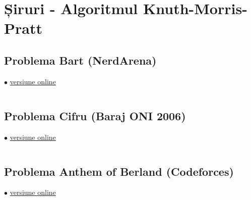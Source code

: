 \documentclass[../main.tex]{subfiles}
\begin{document}
\chapter{Șiruri - Algoritmul Knuth-Morris-Pratt}

\section{Problema Bart (NerdArena)}
\label{code:bart}
$\bullet$
\href{https://www.nerdarena.ro/job_detail/860802?action=view-source}{versiune online}

\inputminted{cpp}{../src/strings/bart.cpp}

\section{Problema Cifru (Baraj ONI 2006)}
\label{code:cifru}
$\bullet$
\href{https://kilonova.ro/submissions/1113957}{versiune online}

\inputminted{cpp}{../src/strings/cifru.cpp}

\section{Problema Anthem of Berland (Codeforces)}
\label{code:anthem-of-berland}
$\bullet$
\href{https://codeforces.com/contest/808/submission/376037518}{versiune online}

\inputminted{cpp}{../src/strings/anthem-of-berland.cpp}
\end{document}
